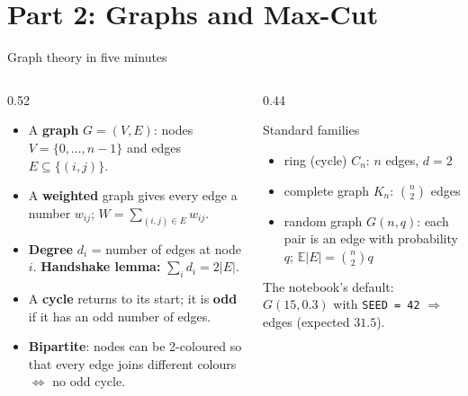 \documentclass[aspectratio=169,11pt]{beamer}
\newcommand{\key}[1]{{\color{qdark}\textbf{#1}}}
\begin{document}
\section{Part 2: Graphs and Max-Cut}
\begin{frame}{Graph theory in five minutes}
  \begin{columns}[T]
    \begin{column}{0.52\textwidth}
      \begin{itemize}
        \item A \key{graph} $G = (V, E)$: nodes $V = \{0, \dots, n-1\}$ and edges $E \subseteq \{(i,j)\}$.
        \item A \key{weighted} graph gives every edge a number $w_{ij}$; $W = \sum_{(i,j)\in E} w_{ij}$.
        \item \key{Degree} $d_i$ = number of edges at node $i$.
          \textbf{Handshake lemma:} $\sum_i d_i = 2|E|$.
        \item A \key{cycle} returns to its start; it is \key{odd} if it has an odd number of edges.
        \item \key{Bipartite}: nodes can be 2-coloured so that every edge joins different colours $\iff$ no odd cycle.
      \end{itemize}
    \end{column}
    \begin{column}{0.44\textwidth}
      \begin{block}{Standard families}
        \begin{itemize}
          \item ring (cycle) $C_n$: $n$ edges, $d = 2$
          \item complete graph $K_n$: $\binom n2$ edges
          \item random graph $G(n, q)$: each pair is an edge with probability $q$; $\mathbb E|E| = \binom n2 q$
        \end{itemize}
      \end{block}
      The notebook's default: $G(15, 0.3)$ with \texttt{SEED = 42} $\Rightarrow$ \numnedges{} edges (expected $31.5$).
    \end{column}
  \end{columns}
\end{frame}
\end{document}
